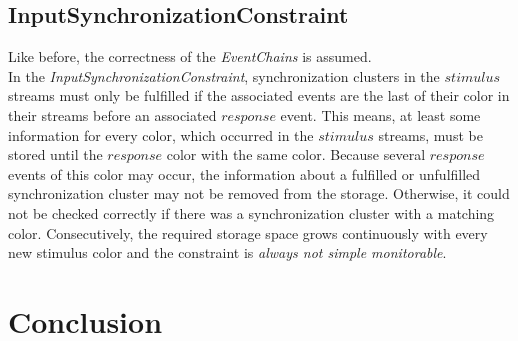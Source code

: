 \subsection{InputSynchronizationConstraint}
	Like before, the correctness of the \textit{EventChains} is assumed.\\
	In the \textit{InputSynchronizationConstraint}, synchronization clusters in the $stimulus$ streams must only be fulfilled if the associated events are the last of their color in their streams before an associated $response$ event. This means, at least some information for every color, which occurred in the $stimulus$ streams, must be stored until the $response$ color with the same color.  Because several $response$ events of this color may occur, the information about a fulfilled or unfulfilled synchronization cluster may not be removed from the storage. Otherwise, it could not be checked correctly if there was a synchronization cluster with a matching color. Consecutively, the required storage space grows continuously with every new stimulus color and the constraint is \textit{always not simple monitorable}. 
	
\section{Conclusion}
	

